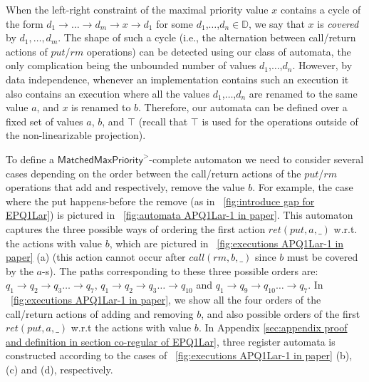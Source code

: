 When the left-right constraint of the maximal priority value $x$ contains a cycle of the form $d_1 \rightarrow \ldots \rightarrow d_m \rightarrow x \rightarrow d_1$ for some $d_1$,$\ldots$,$d_n\in \mathbb{D}$, we say that $x$ is \emph{covered} by $d_1,\ldots,d_m$. The shape of such a cycle (i.e., the alternation between call/return actions of $\textit{put}$/$\textit{rm}$ operations) can be detected using our class of automata, the only complication being the unbounded number of values $d_1$,$\ldots$,$d_n$. However, by data independence, whenever an implementation contains such an execution it also contains an execution where all the values $d_1$,$\ldots$,$d_n$ are renamed to the same value $a$, and $x$ is renamed to $b$. Therefore, our automata can be defined over a fixed set of values $a$, $b$, and $\top$ (recall that $\top$ is used for the operations outside of the non-linearizable projection).

To define a $\mathsf{MatchedMaxPriority}^>$-complete automaton we need to consider several cases depending on the order between the call/return actions of the $\textit{put}$/$\textit{rm}$ operations that add and respectively, remove the value $b$. For example, the case where the put happens-before the remove (as in \figurename~\ref{fig:introduce gap for EPQ1Lar}) is pictured in \figurename~\ref{fig:automata APQ1Lar-1 in paper}. This automaton captures the three possible ways of ordering the first action $\textit{ret}(\textit{put},a,\_)$ w.r.t. the actions with value $b$, which are pictured in \figurename~\ref{fig:executions APQ1Lar-1 in paper} (a) (this action cannot occur after $\textit{call}(\textit{rm},b,\_)$ since $b$ must be covered by the $a$-s). The paths corresponding to these three possible orders are: $q_1 \rightarrow q_2 \rightarrow q_3 \ldots \rightarrow q_7$, $q_1 \rightarrow q_2 \rightarrow q_3 \ldots \rightarrow q_{10}$ and $q_1 \rightarrow q_9 \rightarrow q_{10} \ldots \rightarrow q_7$. In \figurename~\ref{fig:executions APQ1Lar-1 in paper}, we show all the four orders of the call/return actions of adding and removing $b$, and also possible orders of the first $\textit{ret}(\textit{put},a,\_)$ w.r.t the actions with value $b$. In Appendix \ref{sec:appendix proof and definition in section co-regular of EPQ1Lar}, three register automata is constructed according to the cases of \figurename~\ref{fig:executions APQ1Lar-1 in paper} (b), (c) and (d), respectively. 


